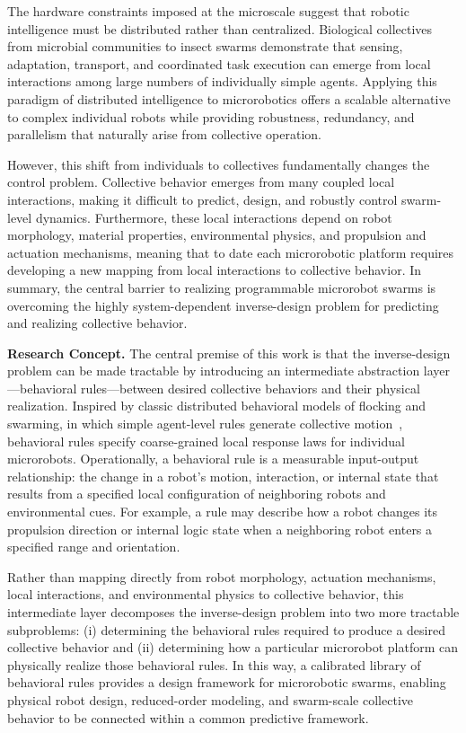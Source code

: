 \documentclass[11pt]{article}
\let\cite=\supercite
\begin{document}
The hardware constraints imposed at the microscale suggest that robotic intelligence must be distributed rather than centralized. 
Biological collectives from microbial communities to insect swarms demonstrate that sensing, adaptation, transport, and coordinated task execution can emerge from local interactions among large numbers of individually simple agents. 
Applying this paradigm of distributed intelligence to microrobotics offers a scalable alternative to complex individual robots while providing robustness, redundancy, and parallelism that naturally arise from collective operation.

However, this shift from individuals to collectives fundamentally changes the control problem.
Collective behavior emerges from many coupled local interactions, making it difficult to predict, design, and robustly control swarm-level dynamics.
Furthermore, these local interactions depend on robot morphology, material properties, environmental physics, and propulsion and actuation mechanisms, meaning that to date each microrobotic platform requires developing a new mapping from local interactions to collective behavior.
In summary, the central barrier to realizing programmable microrobot swarms is overcoming the highly system-dependent inverse-design problem for predicting and realizing collective behavior.

\textbf{Research Concept.}
The central premise of this work is that the inverse-design problem can be made tractable by introducing an intermediate abstraction layer---behavioral rules---between desired collective behaviors and their physical realization. 
Inspired by classic distributed behavioral models of flocking and swarming, in which simple agent-level rules generate collective motion~\cite{Reynolds1987Boids,Vicsek1995SelfDrivenParticles,Couzin2002CollectiveMemory}, behavioral rules specify coarse-grained local response laws for individual microrobots. 
Operationally, a behavioral rule is a measurable input-output relationship: the change in a robot's motion, interaction, or internal state that results from a specified local configuration of neighboring robots and environmental cues. 
For example, a rule may describe how a robot changes its propulsion direction or internal logic state when a neighboring robot enters a specified range and orientation.

Rather than mapping directly from robot morphology, actuation mechanisms, local interactions, and environmental physics to collective behavior, this intermediate layer decomposes the inverse-design problem into two more tractable subproblems: (i) determining the behavioral rules required to produce a desired collective behavior and (ii) determining how a particular microrobot platform can physically realize those behavioral rules.
In this way, a calibrated library of behavioral rules provides a design framework for microrobotic swarms, enabling physical robot design, reduced-order modeling, and swarm-scale collective behavior to be connected within a common predictive framework.
\end{document}
